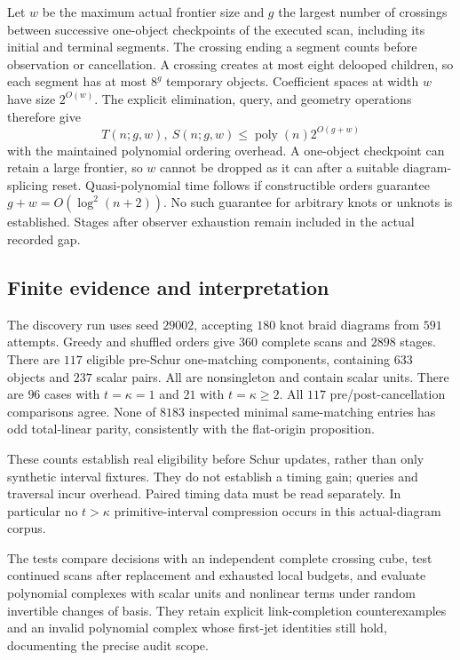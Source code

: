 Let $w$ be the maximum actual frontier size and $g$ the largest number
of crossings between successive one-object checkpoints of the executed
scan, including its initial and terminal segments. The crossing ending
a segment counts before observation or cancellation. A crossing creates
at most eight delooped children, so each segment has at most $8^g$
temporary objects. Coefficient spaces at width $w$ have size $2^{O(w)}$.
The explicit elimination, query, and geometry operations therefore give
\[
 T(n;g,w),\ S(n;g,w)\le\operatorname{poly}(n)2^{O(g+w)}
\]
with the maintained polynomial ordering overhead. A one-object
checkpoint can retain a large frontier, so $w$ cannot be dropped as
it can after a suitable diagram-splicing reset.
Quasi-polynomial time follows if constructible orders guarantee
$g+w=O(\log^2(n+2))$. No such guarantee for arbitrary knots or unknots
is established. Stages after observer exhaustion remain included in
the actual recorded gap.

\subsection{Finite evidence and interpretation}

The discovery run uses seed $29002$, accepting $180$ knot braid diagrams
from $591$ attempts. Greedy and shuffled orders give $360$ complete scans
and $2898$ stages. There are $117$ eligible pre-Schur one-matching
components, containing $633$ objects and $237$ scalar pairs.
All are nonsingleton and contain scalar units. There are $96$ cases
with $t=\kappa=1$ and $21$ with $t=\kappa\ge2$.
All $117$ pre/post-cancellation comparisons agree.
None of $8183$ inspected minimal same-matching entries has odd
total-linear parity, consistently with the flat-origin proposition.

These counts establish real eligibility before Schur updates, rather
than only synthetic interval fixtures. They do not establish a timing
gain; queries and traversal incur overhead. Paired timing data must be
read separately. In particular no $t>\kappa$ primitive-interval
compression occurs in this actual-diagram corpus.

The tests compare decisions with an independent complete crossing cube,
test continued scans after replacement and exhausted local budgets,
and evaluate polynomial complexes with scalar units and nonlinear terms
under random invertible changes of basis. They retain explicit
link-completion counterexamples and an invalid polynomial complex whose
first-jet identities still hold, documenting the precise audit scope.

